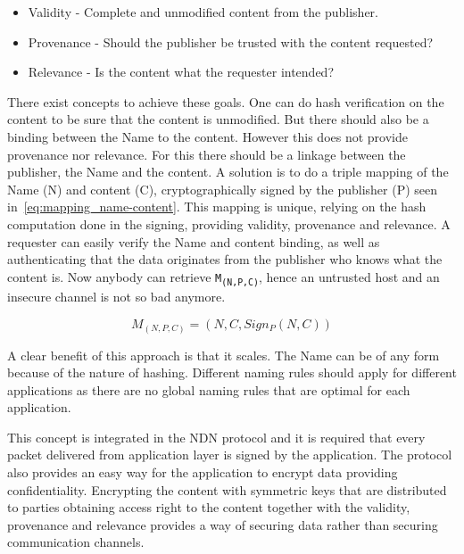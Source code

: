 \begin{itemize}
  \item Validity - Complete and unmodified content from the publisher.
  \item Provenance - Should the publisher be trusted with the content requested?
  \item Relevance - Is the content what the requester intended?
\end{itemize}

There exist concepts to achieve these goals.
One can do hash verification on the content to be sure that the content is unmodified. 
But there should also be a binding between the Name to the content.
However this does not provide provenance nor relevance. 
For this there should be a linkage between the publisher, the Name and the content.
A solution is to do a triple mapping of the Name (N) and content (C), cryptographically signed by the publisher (P) seen in~\autoref{eq:mapping_name-content}.
This mapping is unique, relying on the hash computation done in the signing, providing validity, provenance and relevance.
A requester can easily verify the Name and content binding, as well as authenticating that the data originates from the publisher who knows what the content is.
Now anybody can retrieve \texttt{M\textsubscript{(N,P,C)}}, hence an untrusted host and an insecure channel is not so bad anymore.

\begin{equation}\label{eq:mapping_name-content}
M_{(N, P, C)} = (N,C,Sign_{P}(N,C))
\end{equation}

A clear benefit of this approach is that it scales. 
The Name can be of any form because of the nature of hashing. 
Different naming rules should apply for different applications as there are no global naming rules that are optimal for each application.

This concept is integrated in the \gls{NDN} protocol and it is required that every packet delivered from application layer is signed by the application.
The protocol also provides an easy way for the application to encrypt data providing confidentiality.
Encrypting the content with symmetric keys that are distributed to parties obtaining access right to the content together with the validity, provenance and relevance provides a way of securing data rather than securing communication channels.

